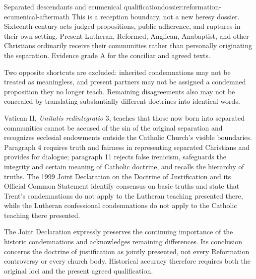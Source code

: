 \begin{heresydossier}{Separated descendants and ecumenical qualification}{dossier:reformation-ecumenical-aftermath}
\objectfield This is a reception boundary, not a new heresy dossier. Sixteenth-century acts judged propositions, public adherence, and ruptures in their own setting. Present Lutheran, Reformed, Anglican, Anabaptist, and other Christians ordinarily receive their communities rather than personally originating the separation. Evidence grade A for the conciliar and agreed texts.

\propositionfield Two opposite shortcuts are excluded: inherited condemnations may not be treated as meaningless, and present partners may not be assigned a condemned proposition they no longer teach. Remaining disagreements also may not be concealed by translating substantially different doctrines into identical words.

\responsefield Vatican II, \emph{Unitatis redintegratio} 3, teaches that those now born into separated communities cannot be accused of the sin of the original separation and recognizes ecclesial endowments outside the Catholic Church's visible boundaries. Paragraph 4 requires truth and fairness in representing separated Christians and provides for dialogue; paragraph 11 rejects false irenicism, safeguards the integrity and certain meaning of Catholic doctrine, and recalls the hierarchy of truths. The 1999 Joint Declaration on the Doctrine of Justification and its Official Common Statement identify consensus on basic truths and state that Trent's condemnations do not apply to the Lutheran teaching presented there, while the Lutheran confessional condemnations do not apply to the Catholic teaching there presented.

\aftermathfield The Joint Declaration expressly preserves the continuing importance of the historic condemnations and acknowledges remaining differences. Its conclusion concerns the doctrine of justification as jointly presented, not every Reformation controversy or every church body. Historical accuracy therefore requires both the original loci and the present agreed qualification.
\end{heresydossier}
